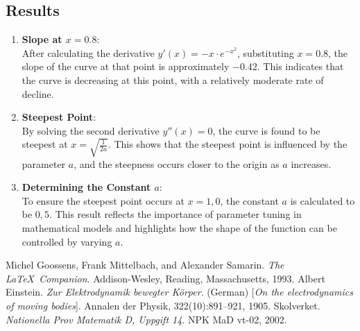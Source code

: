 \documentclass[a4paper,12pt]{article}
\begin{document}
\subsection*{Results}
\begin{enumerate}
    \item \textbf{Slope at $x = 0.8$}: \\ %
    After calculating the derivative $y'\left(x\right) = -x \cdot e^{-x^2}$,
    substituting $x=0.8$, the slope of the curve at that point is approximately
    $-0.42$. This indicates that the curve is decreasing at this point,
    with a relatively moderate rate of decline.
    \item \textbf{Steepest Point}: \\ %
    By solving the second derivative $y''\left(x\right) = 0$, the curve is
    found to be steepest at $x = \sqrt{\frac{1}{2a}}$. This shows that the
    steepest point is influenced by the parameter $a$, and the steepness occurs
    closer to the origin as $a$ increases.
    \item \textbf{Determining the Constant $a$}: \\ %
    To ensure the steepest point occurs at $x = 1,0$, the constant $a$ is
    calculated to be $0,5$. This result reflects the importance of parameter
    tuning in mathematical models and highlights how the shape of the function
    can be controlled by varying $a$.
\end{enumerate}
%
\begin{thebibliography}{99}
%
Michel Goossens, Frank Mittelbach, and Alexander Samarin. 
\textit{The \LaTeX\ Companion}. 
Addison-Wesley, Reading, Massachusetts, 1993.
%
Albert Einstein. 
\textit{Zur Elektrodynamik bewegter K{\"o}rper}. (German) 
[\textit{On the electrodynamics of moving bodies}]. 
Annalen der Physik, 322(10):891–921, 1905.
%
Skolverket.
\textit{Nationella Prov Matematik D, Uppgift 14}.
NPK MaD vt-02, 2002.
\end{thebibliography}
%
\end{document}
